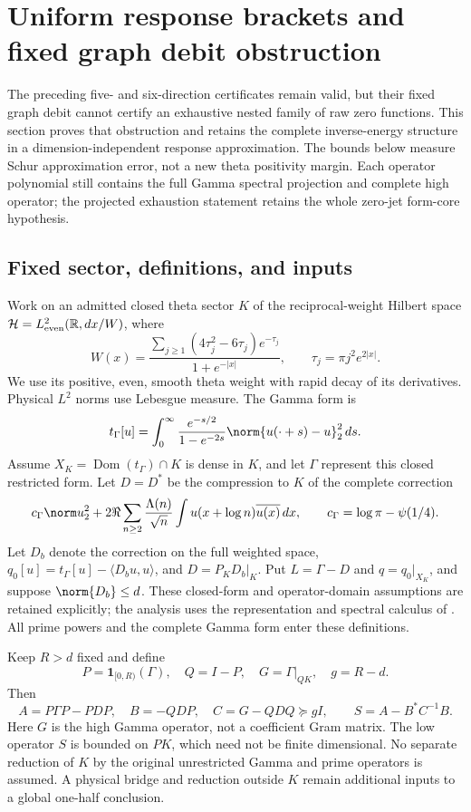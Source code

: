 \documentclass[11pt,a4paper]{article}
\numberwithin{equation}{section}
\theoremstyle{definition}\newtheorem{definition}[theorem]{Definition}
\theoremstyle{remark}\newtheorem{remark}[theorem]{Remark}
\newcommand{\Hh}{\mathcal H}\newcommand{\Hw}{\mathcal H}
\begin{document}
\section{Uniform response brackets and fixed graph debit obstruction}
\label{ur:sec:response}
The preceding five- and six-direction certificates remain valid, but their
fixed graph debit cannot certify an exhaustive nested family of raw zero
functions. This section proves that obstruction and retains the complete
inverse-energy structure in a dimension-independent response approximation.
The bounds below measure Schur approximation error, not a new theta positivity
margin. Each operator polynomial still contains the full Gamma spectral
projection and complete high operator; the projected exhaustion statement
retains the whole zero-jet form-core hypothesis.

\subsection{Fixed sector, definitions, and inputs}
Work on an admitted closed theta sector $K$ of the reciprocal-weight
Hilbert space $\Hh=L^2_{\rm even}(\mathbb R,dx/W)$, where
\[
 W(x)=\frac{\sum_{j\ge1}(4\tau_j^2-6\tau_j)e^{-\tau_j}}{1+e^{-|x|}},
 \qquad\tau_j=\pi j^2e^{2|x|}.
\]
We use its positive, even, smooth theta weight with rapid decay of its
derivatives. Physical $L^2$ norms use Lebesgue measure. The Gamma form is
\[
 t_\Gamma[u]=\int_0^\infty
 \frac{e^{-s/2}}{1-e^{-2s}}\norm{u(\cdot+s)-u}_2^2\,ds.
\]
Assume ${X}_K=\operatorname{Dom}(t_\Gamma)\cap K$ is dense in $K$,
and let $\Gamma$ represent this closed restricted form.
Let $D=D^*$ be the compression to $K$ of the complete correction
\[
 c_\Gamma\norm u_2^2+
 2\Re\sum_{n\ge2}\frac{\Lambda(n)}{\sqrt n}
 \int u(x+\log n)\overline{u(x)}\,dx,
 \qquad c_\Gamma=\log\pi-\psi(1/4).
\]
Let $D_b$ denote the correction on the full weighted space,
$q_0[u]=t_\Gamma[u]-\langle D_bu,u\rangle$, and $D=P_KD_b|_K$.
Put $L=\Gamma-D$ and $q=q_0|_{{X}_K}$, and suppose
$\norm{D_b}\le d$. These closed-form and operator-domain assumptions
are retained explicitly; the analysis uses the representation and
spectral calculus of \cite[Sections 2.3 and 3.1]{gbTeschl}.
All prime powers and the complete Gamma form enter these definitions.

Keep $R>d$ fixed and define
\[
 P=\mathbf1_{[0,R)}(\Gamma),\quad Q=I-P,\quad
 G=\Gamma|_{QK},\quad g=R-d.
\]
Then
\[
 A=P\Gamma P-PDP,\quad B=-QDP,\quad C=G-QDQ\succeq gI,
 \qquad S=A-B^*C^{-1}B.
\]
Here $G$ is the high Gamma operator, not a coefficient Gram matrix.
The low operator $S$ is bounded on $PK$, which need not be finite
dimensional. No separate reduction of $K$ by the original unrestricted
Gamma and prime operators is assumed. A physical bridge and reduction
outside $K$ remain additional inputs to a global one-half conclusion.
\end{document}
